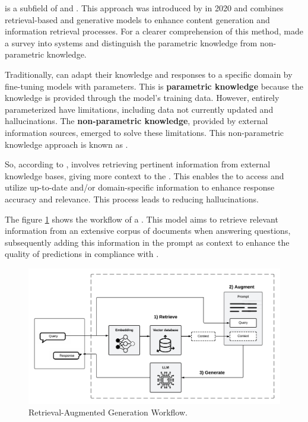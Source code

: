 {\rag} is a subfield of {\nlp} and {\ai}. This approach was introduced by \citet{lewis_retrieval-augmented_2020} in 2020 and combines retrieval-based and generative models to enhance content generation and information retrieval processes. For a clearer comprehension of this method, \citet{gao_retrieval-augmented_2023} made a survey into {\rag} systems and distinguish the parametric knowledge from non-parametric knowledge. 

Traditionally, {\llm} can adapt their knowledge and responses to a specific domain by fine-tuning models with parameters. This is \textbf{parametric knowledge} because the {\llm} knowledge is provided through the model's training data. However, entirely parameterized {\llm} have limitations, including data not currently updated and hallucinations. The \textbf{non-parametric knowledge}, provided by external information sources, emerged to solve these limitations. This non-parametric knowledge approach is known as {\rag}. 

So, according to \citet{lewis_retrieval-augmented_2020}, {\rag} involves retrieving pertinent information from external knowledge bases, giving more context to the {\llm}. This enables the {\llm} to access and utilize up-to-date and/or domain-specific information to enhance response accuracy and relevance. This process leads to reducing hallucinations.

The figure \ref{fig_rag} shows the workflow of a {\rag}. This model aims to retrieve relevant information from an extensive corpus of documents when answering questions, subsequently adding this information in the prompt as context to enhance the quality of predictions in compliance with \citet{lewis_retrieval-augmented_2020}.

\begin{figure}[ht]
    \includegraphics[width=14cm]{figs/chapter2/rag_workflow.png}
    \centering
    \caption{Retrieval-Augmented Generation Workflow.}
    \label{fig_rag}
\end{figure}


